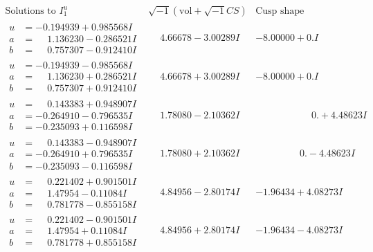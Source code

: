 \documentclass[1p]{elsarticle_modified}
\theoremstyle{definition}
\newcommand{\I}{\sqrt{-1}}
\begin{document}
$$\begin{array}{c|c|c}  
\text{Solutions to }I^u_{1}& \I (\text{vol} + \sqrt{-1}CS) & \text{Cusp shape}\\
 \hline 
\begin{aligned}
u &= -0.194939 + 0.985568 I \\
a &= \phantom{-}1.136230 - 0.286521 I \\
b &= \phantom{-}0.757307 - 0.912410 I\end{aligned}
 & \phantom{-}4.66678 - 3.00289 I & -8.00000 + 0. I\phantom{ +0.000000I} \\ \hline\begin{aligned}
u &= -0.194939 - 0.985568 I \\
a &= \phantom{-}1.136230 + 0.286521 I \\
b &= \phantom{-}0.757307 + 0.912410 I\end{aligned}
 & \phantom{-}4.66678 + 3.00289 I & -8.00000 + 0. I\phantom{ +0.000000I} \\ \hline\begin{aligned}
u &= \phantom{-}0.143383 + 0.948907 I \\
a &= -0.264910 - 0.796535 I \\
b &= -0.235093 + 0.116598 I\end{aligned}
 & \phantom{-}1.78080 - 2.10362 I & \phantom{-0.000000 -}0. + 4.48623 I \\ \hline\begin{aligned}
u &= \phantom{-}0.143383 - 0.948907 I \\
a &= -0.264910 + 0.796535 I \\
b &= -0.235093 - 0.116598 I\end{aligned}
 & \phantom{-}1.78080 + 2.10362 I & \phantom{-0.000000 } 0. - 4.48623 I \\ \hline\begin{aligned}
u &= \phantom{-}0.221402 + 0.901501 I \\
a &= \phantom{-}1.47954 - 0.11084 I \\
b &= \phantom{-}0.781778 - 0.855158 I\end{aligned}
 & \phantom{-}4.84956 - 2.80174 I & -1.96434 + 4.08273 I \\ \hline\begin{aligned}
u &= \phantom{-}0.221402 - 0.901501 I \\
a &= \phantom{-}1.47954 + 0.11084 I \\
b &= \phantom{-}0.781778 + 0.855158 I\end{aligned}
 & \phantom{-}4.84956 + 2.80174 I & -1.96434 - 4.08273 I \\ \hline\begin{aligned}

\end{aligned}
\end{array}$$
\end{document}
